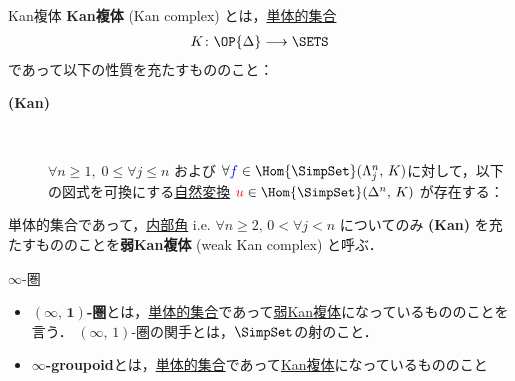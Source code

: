 \documentclass[TQFT_main]{subfiles}
\begin{document}
\begin{mydef}[label=def:KanCplx]{Kan複体}
    \textbf{Kan複体} (Kan complex) とは，\hyperref[def:simplicial-sets]{単体的集合}
    \begin{align}
        K \colon \OP{\Delta} \lto \SETS
    \end{align}
    であって以下の性質を充たすもののこと：

    \begin{description}
        \item[\textbf{(Kan)}]　
        
        $\forall n \ge 1,\; 0 \le \forall j \le n$ および $\forall \textcolor{blue}{f} \in \Hom{\SimpSet}(\Lambda^n_j,\, K)$に対して，以下の図式を可換にする\hyperref[def:nat]{自然変換} $\textcolor{red}{u} \in \Hom{\SimpSet}(\Delta^n,\, K)$ が存在する：
        \begin{center}
        \end{center}
        
    \end{description}
    
    \tcblower

    単体的集合であって，\hyperref[def:horn]{内部角} i.e. $\forall n \ge 2,\, 0 < \forall j < n$ についてのみ \textsf{\textbf{(Kan)}} を充たすもののことを\textbf{弱Kan複体} (weak Kan complex) と呼ぶ．
\end{mydef}

\begin{mydef}[label=def:infinity-1]{$\infty$-圏}
    \begin{itemize}
        \item $\bm{(\infty,\, 1)}$\textbf{-圏}とは，\hyperref[def:simplicial-sets]{単体的集合}であって\hyperref[def:KanCplx]{弱Kan複体}になっているもののことを言う．
        $(\infty,\, 1)$-圏の関手とは，\hyperref[def:SimpSet]{$\SimpSet$}の射のこと．
        \item $\bm{\infty}$\textbf{-groupoid}とは，\hyperref[def:simplicial-sets]{単体的集合}であって\hyperref[def:KanCplx]{Kan複体}になっているもののこと
    \end{itemize}
    
\end{mydef}
\end{document}
